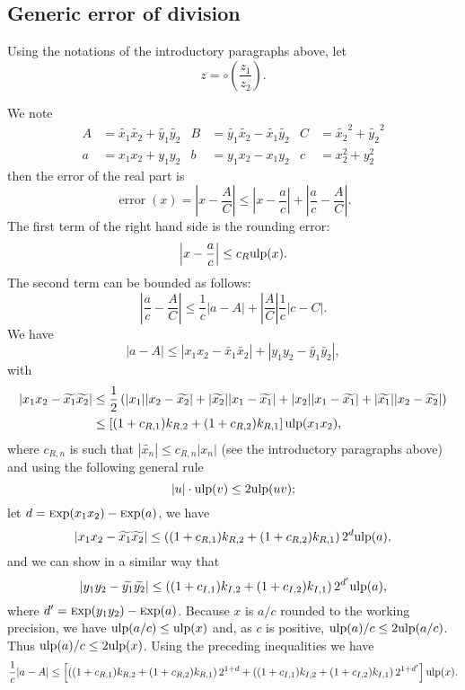 \documentclass {article}
\newcommand {\Ulp}{{\rm ulp}}
\DeclareMathOperator{\error}{error}
\DeclareMathOperator{\Exp}{{\rm \textsc exp}}
\begin{document}
\subsection {Generic error of division}\label{generic:div}

Using the notations of the introductory paragraphs above, let
\[
z=\circ(\frac{z_1}{z_2}).
\]

We note
\begin{align*}
A&=\widetilde{x_1}\widetilde{x_2}+\widetilde{y_1}\widetilde{y_2}&
B&=\widetilde{y_1}\widetilde{x_2}-\widetilde{x_1}\widetilde{y_2}&
C&=\widetilde{x_2}^2+\widetilde{y_2}^2\\
a&=x_1x_2+y_1y_2&
b&=y_1x_2-x_1y_2&
c&=x_2^2+y_2^2
\end{align*}
then the error of the real part is
\[
\error(x) = \left|x-\frac{A}{C}\right| \leq \left|x-\frac{a}{c}\right| +
\left|\frac{a}{c}-\frac{A}{C}\right|.
\]
The first term of the right hand side is the rounding error:
\[
\left|x-\frac{a}{c}\right|\leq c_R \Ulp(x).
\]
The second term can be bounded as follows:
\[
\left|\frac{a}{c}-\frac{A}{C}\right| \leq \frac{1}{c} |a-A|
+\left|\frac{A}{C}\right|\frac{1}{c}|c-C|.
\]
We have
\[
|a-A| \leq |x_1x_2-\widetilde{x_1}\widetilde{x_2}|
+|y_1y_2-\widetilde{y_1}\widetilde{y_2}|,
\]
with
\begin{align*}
|x_1x_2-\widetilde{x_1}\widetilde{x_2}| &\leq \frac{1}{2} \left(
|x_1||x_2-\widetilde{x_2}|+|\widetilde{x_2}||x_1-\widetilde{x_1}|
+|x_2||x_1-\widetilde{x_1}|+|\widetilde{x_1}||x_2-\widetilde{x_2}| \right)\\
&\leq \left[ (1+c_{R,1})k_{R,2}+(1+c_{R,2})k_{R,1} \right] \Ulp(x_1x_2),
\end{align*}
where $c_{R,n}$ is such that $|\widetilde{x_n}| \leq c_{R,n} |x_n|$ (see the
introductory paragraphs above) and using the following general rule
\[
|u|\cdot\Ulp(v) \leq 2\Ulp(uv);
\]
let $d=\Exp(x_1x_2)-\Exp(a)$, we have
\[
|x_1x_2-\widetilde{x_1}\widetilde{x_2}| \leq 
\left((1+c_{R,1})k_{R,2}+(1+c_{R,2})k_{R,1}\right)2^d \Ulp(a),
\]
and we can show in a similar way that
\[
|y_1y_2-\widetilde{y_1}\widetilde{y_2}| \leq \left( (1+c_{I,1})k_{I,2}
+(1+c_{I,2})k_{I,1} \right)2^{d'} \Ulp(a),
\]
where $d'=\Exp(y_1y_2)-\Exp(a)$. Because $x$ is $a/c$ rounded to the working
precision, we have $\Ulp(a/c) \leq \Ulp(x)$ and, as $c$ is positive,
$\Ulp(a)/c \leq 2\Ulp(a/c)$. Thus $\Ulp(a)/c \leq 2\Ulp(x)$. Using the
preceding inequalities we have
\[
\frac{1}{c}|a-A| \leq \left[
\left((1+c_{R,1})k_{R,2}+(1+c_{R,2})k_{R,1}\right)2^{1+d}
+\left((1+c_{I,1})k_{I,2}+(1+c_{I,2})k_{I,1}\right)2^{1+d'}
\right] \Ulp(x).
\]
\end{document}
